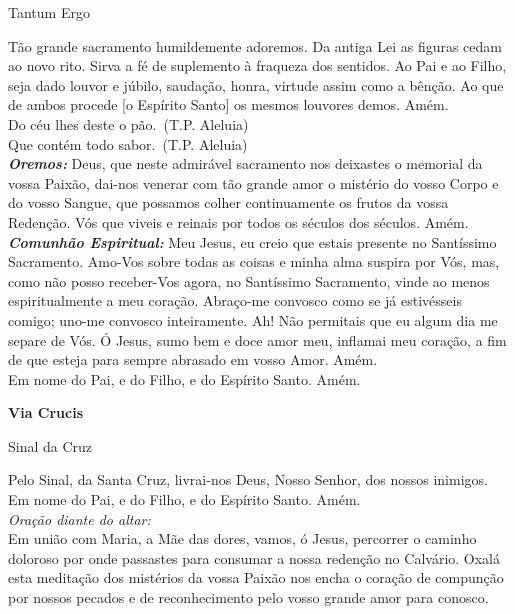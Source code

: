 \documentclass{book}
\begin{document}
\newpage
\begin{center}
    Tantum Ergo
\end{center}
\begin{flushleft}
    Tão grande sacramento humildemente adoremos. Da antiga Lei as figuras cedam ao novo rito. Sirva a fé de suplemento à fraqueza dos sentidos. Ao Pai e ao Filho, seja dado louvor e júbilo, saudação, honra, virtude assim como a bênção. Ao que de ambos procede [o Espírito Santo] os mesmos louvores demos. Amém.
    \vspace{.2cm} \\
    \VbarRed{} Do céu lhes deste o pão.\ (\textcolor{VioletRed2}{T.P.} Aleluia) \\
    \RbarRed{} Que contém todo sabor.\ (\textcolor{VioletRed2}{T.P.} Aleluia)
    \vspace{.2cm} \\
    \textbf{\textit{Oremos:}} Deus, que neste admirável sacramento nos deixastes o memorial da vossa Paixão, dai-nos venerar com tão grande amor o mistério do vosso Corpo e do vosso Sangue, que possamos colher continuamente os frutos da vossa Redenção. Vós que viveis e reinais por todos os séculos dos séculos. Amém.
    \vspace{.2cm} \\
    \textbf{\textit{Comunhão Espiritual:}} Meu Jesus, eu creio que estais presente no Santíssimo Sacramento. Amo-Vos sobre todas as coisas e minha alma suspira por Vós, mas, como não posso receber-Vos agora, no Santíssimo Sacramento, vinde ao menos espiritualmente a meu coração. Abraço-me convosco como se já estivésseis comigo; uno-me convosco inteiramente. Ah! Não permitais que eu algum dia me separe de Vós. Ó Jesus, sumo bem e doce amor meu, inflamai meu coração, a fim de que esteja para sempre abrasado em vosso Amor. Amém.
    \vspace{.2cm} \\
    Em nome do Pai, \grecrossRed{} e do Filho, e do Espírito Santo. Amém.
\end{flushleft}
\newpage
\begin{center}
    \textbf{Via Crucis}
\end{center}
\begin{center}
    Sinal da Cruz
\end{center}
\begin{flushleft}
    Pelo Sinal, \grecrossRed{} da Santa Cruz, livrai-nos Deus, \grecrossRed{} Nosso Senhor, dos nossos \grecrossRed{} inimigos. Em nome do Pai, \grecrossRed{} e do Filho, e do Espírito Santo. Amém.
    \vspace{.2cm} \\
    \textit{Oração diante do altar:}
    \vspace{.2cm} \\
    Em união com Maria, a Mãe das dores, vamos, ó Jesus, percorrer o caminho doloroso por onde passastes para consumar a nossa redenção no Calvário. Oxalá esta meditação dos mistérios da vossa Paixão nos encha o coração de compunção por nossos pecados e de reconhecimento pelo vosso grande amor para conosco.
\end{flushleft}
\end{document}
